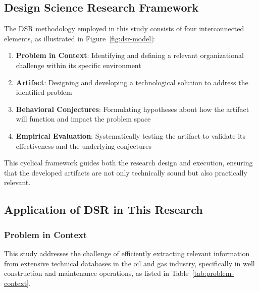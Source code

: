     \subsection{Design Science Research Framework}
    
        The DSR methodology employed in this study consists of four interconnected elements, as illustrated in Figure~\ref{fig:dsr-model}:
        
        \begin{enumerate}
        \item \textbf{Problem in Context}: Identifying and defining a relevant organizational challenge within its specific environment
        \item \textbf{Artifact}: Designing and developing a technological solution to address the identified problem
        \item \textbf{Behavioral Conjectures}: Formulating hypotheses about how the artifact will function and impact the problem space
        \item \textbf{Empirical Evaluation}: Systematically testing the artifact to validate its effectiveness and the underlying conjectures
        \end{enumerate}
        
        This cyclical framework guides both the research design and execution, ensuring that the developed artifacts are not only technically sound but also practically relevant.
    
    \subsection{Application of DSR in This Research} \label{sec:dsr-application}
        
        \subsubsection{Problem in Context}
        
        This study addresses the challenge of efficiently extracting relevant information from extensive technical databases in the oil and gas industry, specifically in well construction and maintenance operations, as listed in Table~\ref{tab:problem-context}. 
        
